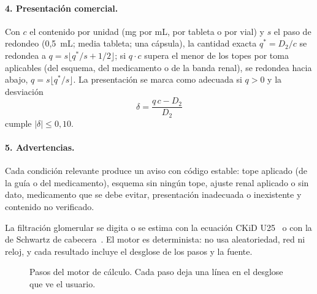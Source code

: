 \documentclass[11pt,a4paper]{article}
\begin{document}
\paragraph{4. Presentación comercial.} Con $c$ el contenido por unidad (mg por mL, por tableta o por vial) y $s$ el paso de redondeo (0,5~mL; media tableta; una cápsula), la cantidad exacta $q^{*} = D_2/c$ se redondea a $q = s\lfloor q^{*}/s + 1/2\rfloor$; si $q \cdot c$ supera el menor de los topes por toma aplicables (del esquema, del medicamento o de la banda renal), se redondea hacia abajo, $q = s\lfloor q^{*}/s\rfloor$. La presentación se marca como adecuada si $q > 0$ y la desviación
\begin{equation}
\delta = \frac{q\,c - D_2}{D_2}
\end{equation}
cumple $|\delta| \le 0{,}10$.

\paragraph{5. Advertencias.} Cada condición relevante produce un aviso con código estable: tope aplicado (de la guía o del medicamento), esquema sin ningún tope, ajuste renal aplicado o sin dato, medicamento que se debe evitar, presentación inadecuada o inexistente y contenido no verificado.

La filtración glomerular se digita o se estima con la ecuación CKiD U25~\citep{pierce2021} o con la de Schwartz de cabecera~\citep{schwartz2009}. El motor es determinista: no usa aleatoriedad, red ni reloj, y cada resultado incluye el desglose de los pasos y la fuente.

\begin{figure}[htbp]
\centering
{}
\caption{Pasos del motor de cálculo. Cada paso deja una línea en el desglose que ve el usuario.}
\label{fig:motor}
\end{figure}
\end{document}
